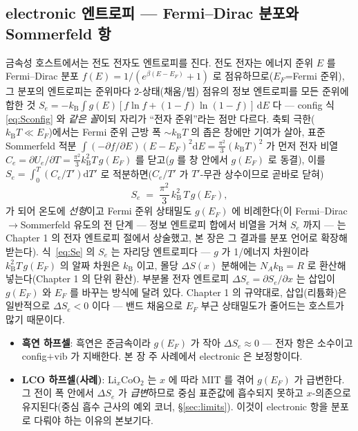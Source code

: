 \documentclass[11pt,a4paper]{article}
\newcommand{\dd}{\mathrm{d}}
\newcommand{\kB}{k_{\mathrm B}}
\begin{document}
\subsection{electronic 엔트로피 — Fermi--Dirac 분포와 Sommerfeld 항}\label{ssec:elec}
금속성 호스트에서는 전도 전자도 엔트로피를 진다. 전도 전자는 에너지 준위 $E$ 를 Fermi--Dirac 분포
$f(E)=1/(e^{\beta(E-E_F)}+1)$ 로 점유하므로($E_F$=Fermi 준위), 그 분포의 엔트로피는 준위마다 2-상태(채움/빔)
점유의 정보 엔트로피를 모든 준위에 합한 것 $S_e=-\kB\int g(E)[f\ln f+(1-f)\ln(1-f)]\,\dd E$ 다 — config 식
\eqref{eq:Sconfig} 와 \emph{같은 꼴}이되 자리가 ``전자 준위''라는 점만 다르다. 축퇴 극한($\kB T\ll E_F$)에서는
Fermi 준위 근방 폭 $\sim\kB T$ 의 좁은 창에만 기여가 살아, 표준 Sommerfeld 적분
$\int(-\partial f/\partial E)(E-E_F)^2\dd E=\tfrac{\pi^2}{3}(\kB T)^2$ 가 먼저 전자 비열 $C_e=\partial U_e/\partial T
=\tfrac{\pi^2}{3}\kB^2T\,g(E_F)$ 를 닫고($g$ 를 창 안에서 $g(E_F)$ 로 동결), 이를 $S_e=\int_0^T(C_e/T')\dd T'$ 로
적분하면($C_e/T'$ 가 $T'$-무관 상수이므로 곧바로 닫혀)
\begin{equation}
S_e \;=\; \frac{\pi^2}{3}\,\kB^2\,T\,g(E_F),
\label{eq:Se}
\end{equation}
가 되어 온도에 \emph{선형}이고 Fermi 준위 상태밀도 $g(E_F)$ 에 비례한다(이 Fermi--Dirac$\to$Sommerfeld
유도의 전 단계 — 정보 엔트로피 합에서 비열을 거쳐 $S_e$ 까지 — 는 Chapter 1 의 전자 엔트로피 절에서 상술했고,
본 장은 그 결과를 분포 언어로 확장해 받는다). 식~\eqref{eq:Se} 의 $S_e$ 는 자리당 엔트로피다 — $g$ 가
1/에너지 차원이라 $\kB^2 T\,g(E_F)$ 의 알짜 차원은 $\kB$ 이고, 몰당 $\Delta S(x)$ 분해에는 $N_A\kB=R$ 로
환산해 넣는다(Chapter 1 의 단위 환산). 부분몰 전자 엔트로피
$\Delta S_e=\partial S_e/\partial x$ 는 삽입이 $g(E_F)$ 와 $E_F$ 를 바꾸는 방식에 달려 있다. Chapter 1 의
규약대로, 삽입(리튬화)은 일반적으로 $\Delta S_e<0$ 이다 — 밴드 채움으로 $E_F$ 부근 상태밀도가 줄어드는 호스트가
많기 때문이다.
\begin{itemize}[leftmargin=1.4em,itemsep=1pt]
\item \textbf{흑연 하프셀}: 흑연은 준금속이라 $g(E_F)$ 가 작아 $\Delta S_e\approx0$ — 전자 항은 소수이고
config$+$vib 가 지배한다. 본 장 주 사례에서 electronic 은 보정항이다.
\item \textbf{LCO 하프셀(사례)}: Li$_x$CoO$_2$ 는 $x$ 에 따라 MIT 를 겪어 $g(E_F)$ 가
급변한다. 그 전이 폭 안에서 $\Delta S_e$ 가 \emph{급변}하므로 중심 표준값에 흡수되지 못하고 $x$-의존으로
유지된다(중심 흡수 근사의 예외 코너, \S\ref{sec:limits}). 이것이 electronic 항을 분포로 다뤄야 하는 이유의 본보기다.
\end{itemize}
\end{document}
